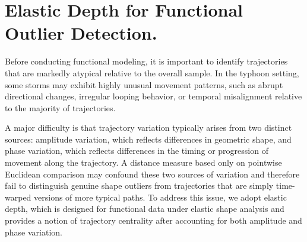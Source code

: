 \documentclass{article}
\begin{document}
\section{Elastic Depth for Functional Outlier Detection.}
\label{sec:outlier}

Before conducting functional modeling, it is important to identify trajectories that are markedly atypical relative to the overall sample. In the typhoon setting, some storms may exhibit highly unusual movement patterns, such as abrupt directional changes, irregular looping behavior, or temporal misalignment relative to the majority of trajectories.

A major difficulty is that trajectory variation typically arises from two distinct sources: amplitude variation, which reflects differences in geometric shape, and phase variation, which reflects differences in the timing or progression of movement along the trajectory. A distance measure based only on pointwise Euclidean comparison may confound these two sources of variation and therefore fail to distinguish genuine shape outliers from trajectories that are simply time-warped versions of more typical paths. To address this issue, we adopt elastic depth, which is designed for functional data under elastic shape analysis and provides a notion of trajectory centrality after accounting for both amplitude and phase variation.
\end{document}
